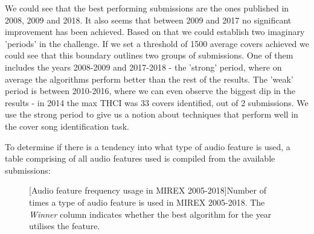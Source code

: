 We could see that the best performing submissions are the ones published in
2008, 2009 and 2018. It also seems that between 2009 and 2017 no significant
improvement has been achieved. Based on that we could establish two imaginary
'periods' in the challenge. If we set a threshold of 1500 average covers
achieved we could see that this boundary outlines two groups of submissions. One
of them includes the years 2008-2009 and 2017-2018 - the 'strong' period, where
on average the algorithms perform better than the rest of the results. The
'weak' period is between 2010-2016, where we can even observe the biggest dip in
the results - in 2014 the max THCI was 33 covers identified, out of 2
submissions. We use the strong period to give us a notion about techniques that
perform well in the cover song identification task. 

To determine if there is a tendency into what type of audio feature is used, a
table comprising of all audio features used is compiled from the available
submissions:
\begin{figure}[H]
    \centering
    [Audio feature frequency usage in MIREX 2005-2018]{Number of times a type of audio feature is used in MIREX 2005-2018. The \textit{Winner} column indicates whether the best algorithm for the year utilises the feature.}
\end{figure}

